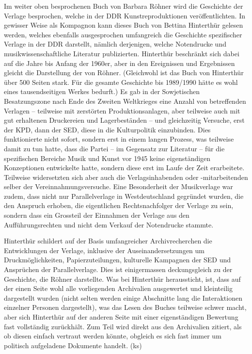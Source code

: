 \documentclass[a4paper,
fontsize=11pt,
oneside,
numbers=noperiodatend,
parskip=half-,
bibliography=totoc,
final
]{scrartcl}
\begin{document}
Im weiter oben besprochenen Buch von Barbara Röhner wird die Geschichte
der Verlage besprochen, welche in der DDR Kunstreproduktionen
veröffentlichten. In gewisser Weise als Kompagnon kann dieses Buch von
Bettina Hinterthür gelesen werden, welches ebenfalls ausgesprochen
umfangreich die Geschichte spezifischer Verlage in der DDR darstellt,
nämlich derjenigen, welche Notendrucke und musikwissenschaftliche
Literatur publizierten. Hinterthür beschränkt sich dabei auf die Jahre
bis Anfang der 1960er, aber in den Ereignissen und Ergebnissen gleicht
die Darstellung der von Röhner. (Gleichwohl ist das Buch von Hinterthür
über 500 Seiten stark. Für die gesamte Geschichte bis 1989/1990 hätte es
wohl eines tausendseitigen Werkes bedurft.) Es gab in der Sowjetischen
Besatzungszone nach Ende des Zweiten Weltkrieges eine Anzahl von
betreffenden Verlagen – teilweise mit zerstörten Produktionsanlagen,
aber teilweise auch mit gut erhaltenen Druckereien und Lagerbeständen – und gleichzeitig Versuche, erst der KPD, dann der SED, diese in die
Kulturpolitik einzubinden. Dies funktionierte nicht sofort, sondern erst
in einem langen Prozess, was teilweise damit zu tun hatte, dass die
Partei – im Gegensatz zur Literatur – für die spezifischen Bereiche
Musik und Kunst vor 1945 keine eigenständigen Konzeptionen entwickelte
hatte, sondern diese erst im Laufe der Zeit erarbeitete. Teilweise
widersetzten sich aber auch die Verlagsinhabenden oder -mitarbeitenden
selber der Vereinnahmungsversuche. Eine Besonderheit der Musikverlage
war zudem, dass nicht nur Parallelverlage in Westdeutschland gegründet
wurden, die den Anspruch erhoben, die eigentlichen Rechtsnachfolger der
Verlage zu sein, sondern dass ein Grossteil der Einnahmen der Verlage
aus den Aufführungsrechten und nicht dem Verkauf der Notendrucke
stammte.

Hinterthür schildert auf der Basis umfangreicher Archivrecherchen die
Entwicklungen der Verlage, inklusive der Auseinandersetzungen um
Druckmöglichkeiten, Papierzuteilungen, kulturelle Kampagnen der SED und
Ansprüchen der Parallelverlage. Dies ist einigermassen deckungsgleich zu
der Geschichte, die Röhner darstellte. Was bei Hinterthür heraussticht,
ist, dass auf der einen Seite wohl alle vorliegenden Archivalien
ausgewertet und kleinteilig dargestellt wurden (nicht selten werden
einige Abschnitte lang die Interaktionen einzelner Personen
dargestellt), was das Lesen des Buches teilweise schwer macht, aber sich
Hinterthür auf der anderen Seite mit einer eigenständigen Bewertung fast
vollständig zurückhält. Zum Teil wird direkt aus den Archivalien
zitiert, als ob diesen einfach vertraut werden könnte, obgleich es sich
fast immer um politisch aufgeladene Dokumente handelt. (ks)
\end{document}
